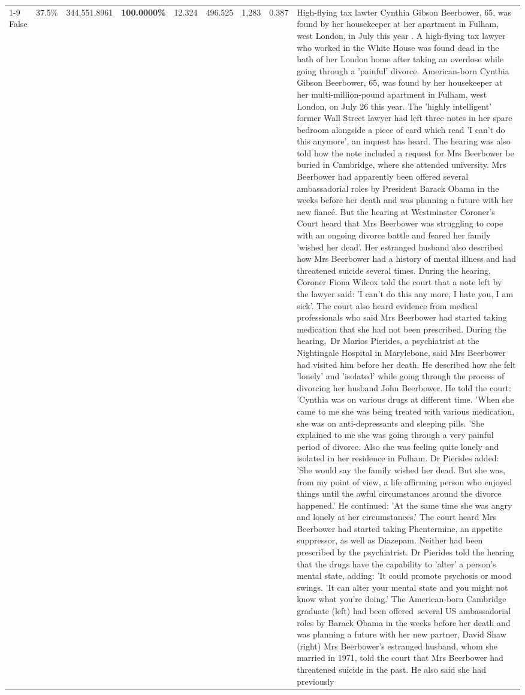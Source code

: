 \begin{table}[H]
\begin{tabular}{lllrlllll}
\cline{1-9}
False & 37.5\% & 344,551.8961 & \bfseries \color{red} 100.0000\% & 12.324 & 496.525 & 1,283 & 0.387 & High-flying tax lawter Cynthia Gibson Beerbower, 65, was found by her housekeeper at her apartment in Fulham, west London, in July this year . A high-flying tax lawyer who worked in the White House was found dead in the bath of her London home after taking an overdose while going through a 'painful' divorce. American-born Cynthia Gibson Beerbower, 65, was found by her housekeeper at her multi-million-pound apartment in Fulham, west London, on July 26 this year. The 'highly intelligent' former Wall Street lawyer had left three notes in her spare bedroom alongside a piece of card which read 'I can't do this anymore', an inquest has heard. The hearing was also told how the note included a request for Mrs Beerbower be buried in Cambridge, where she attended university. Mrs Beerbower had apparently been offered several ambassadorial roles by President Barack Obama in the weeks before her death and was planning a future with her new fiancé. But the hearing at Westminster Coroner's Court heard that Mrs Beerbower was struggling to cope with an ongoing divorce battle and feared her family 'wished her dead'. Her estranged husband also described how Mrs Beerbower had a history of mental illness and had threatened suicide several times. During the hearing, Coroner Fiona Wilcox told the court that a note left by the lawyer said: 'I can't do this any more, I hate you, I am sick'. The court also heard evidence from medical professionals who said Mrs Beerbower had started taking medication that she had not been prescribed. During the hearing, Dr Marios Pierides, a psychiatrist at the Nightingale Hospital in Marylebone, said Mrs Beerbower had visited him before her death. He described how she felt 'lonely' and 'isolated' while going through the process of divorcing her husband John Beerbower. He told the court: 'Cynthia was on various drugs at different time. 'When she came to me she was being treated with various medication, she was on anti-depressants and sleeping pills. 'She explained to me she was going through a very painful period of divorce. Also she was feeling quite lonely and isolated in her residence in Fulham. Dr Pierides added: 'She would say the family wished her dead. But she was, from my point of view, a life affirming person who enjoyed things until the awful circumstances around the divorce happened.' He continued: 'At the same time she was angry and lonely at her circumstances.' The court heard Mrs Beerbower had started taking Phentermine, an appetite suppressor, as well as Diazepam. Neither had been prescribed by the psychiatrist. Dr Pierides told the hearing that the drugs have the capability to 'alter' a person's mental state, adding: 'It could promote psychosis or mood swings. 'It can alter your mental state and you might not know what you're doing.' The American-born Cambridge graduate (left) had been offered several US ambassadorial roles by Barack Obama in the weeks before her death and was planning a future with her new partner, David Shaw (right) Mrs Beerbower's estranged husband, whom she married in 1971, told the court that Mrs Beerbower had threatened suicide in the past. He also said she had previously 
\end{tabular}
\end{table}
